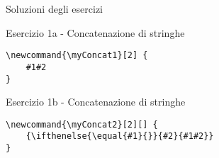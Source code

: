 \begin{frame}[fragile]{Soluzioni degli esercizi}

\begin{block}{Esercizio 1a - Concatenazione di stringhe}

\begin{lstlisting}
\newcommand{\myConcat1}[2] {
	#1#2
}
\end{lstlisting}

\end{block}

\begin{block}{Esercizio 1b - Concatenazione di stringhe}

\begin{lstlisting}
\newcommand{\myConcat2}[2][] {
	{\ifthenelse{\equal{#1}{}}{#2}{#1#2}}
}
\end{lstlisting}

\end{block}

\end{frame}
